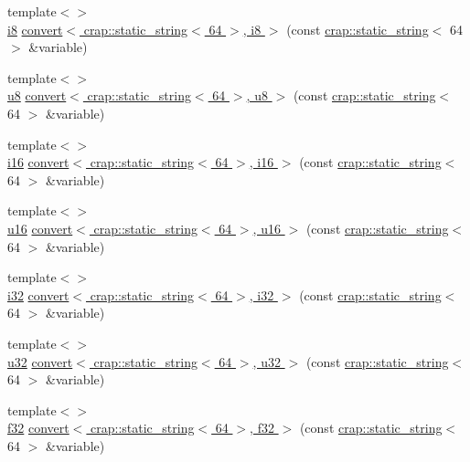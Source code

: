 \begin{DoxyCompactItemize}
\item 
{\footnotesize template$<$$>$ }\\\hyperlink{types_8h_ae3702327b5f47e83b431e22b33da7b58}{i8} \hyperlink{namespacecrap_aba96950708a038b3d0fa3331c909e87a}{convert$<$ crap\-::static\-\_\-string$<$ 64 $>$, i8 $>$} (const \hyperlink{classcrap_1_1static__string}{crap\-::static\-\_\-string}$<$ 64 $>$ \&variable)
\item 
{\footnotesize template$<$$>$ }\\\hyperlink{types_8h_a92c50087ca0e64fa93fc59402c55f8ca}{u8} \hyperlink{namespacecrap_aca77e4f7181ef9c182a87a0dc412f8ab}{convert$<$ crap\-::static\-\_\-string$<$ 64 $>$, u8 $>$} (const \hyperlink{classcrap_1_1static__string}{crap\-::static\-\_\-string}$<$ 64 $>$ \&variable)
\item 
{\footnotesize template$<$$>$ }\\\hyperlink{types_8h_ad309dbcaeea13aa602d686964156ea0b}{i16} \hyperlink{namespacecrap_ac094f9891f04e7b19500ed5b1cef337e}{convert$<$ crap\-::static\-\_\-string$<$ 64 $>$, i16 $>$} (const \hyperlink{classcrap_1_1static__string}{crap\-::static\-\_\-string}$<$ 64 $>$ \&variable)
\item 
{\footnotesize template$<$$>$ }\\\hyperlink{types_8h_ace9d960e74685e2cd84b36132dbbf8aa}{u16} \hyperlink{namespacecrap_a6e7041fa45aac025ab4fd41d5d22f5b1}{convert$<$ crap\-::static\-\_\-string$<$ 64 $>$, u16 $>$} (const \hyperlink{classcrap_1_1static__string}{crap\-::static\-\_\-string}$<$ 64 $>$ \&variable)
\item 
{\footnotesize template$<$$>$ }\\\hyperlink{types_8h_a48d6cd8e4135fb2ff7e7f2dac84089ec}{i32} \hyperlink{namespacecrap_a64635e0ea2f91f3e8a82b860c7c5bfbc}{convert$<$ crap\-::static\-\_\-string$<$ 64 $>$, i32 $>$} (const \hyperlink{classcrap_1_1static__string}{crap\-::static\-\_\-string}$<$ 64 $>$ \&variable)
\item 
{\footnotesize template$<$$>$ }\\\hyperlink{types_8h_afaa62991928fb9fb18ff0db62a040aba}{u32} \hyperlink{namespacecrap_a79d99ec6a768005846f42589d65bd75d}{convert$<$ crap\-::static\-\_\-string$<$ 64 $>$, u32 $>$} (const \hyperlink{classcrap_1_1static__string}{crap\-::static\-\_\-string}$<$ 64 $>$ \&variable)
\item 
{\footnotesize template$<$$>$ }\\\hyperlink{types_8h_a154db6eda6a99565cb060a1da4b4c930}{f32} \hyperlink{namespacecrap_a7f98418fe3566a75d76f5a1e242fe6fa}{convert$<$ crap\-::static\-\_\-string$<$ 64 $>$, f32 $>$} (const \hyperlink{classcrap_1_1static__string}{crap\-::static\-\_\-string}$<$ 64 $>$ \&variable)

\end{DoxyCompactItemize}
